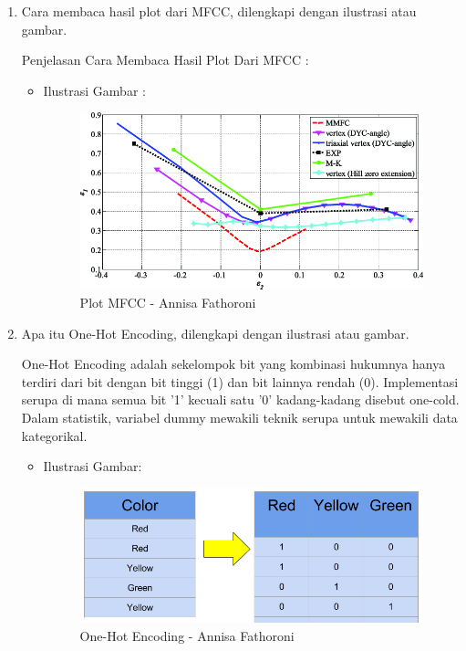\begin{enumerate}
\item Cara membaca hasil plot dari MFCC, dilengkapi dengan ilustrasi atau gambar.

Penjelasan Cara Membaca Hasil Plot Dari MFCC :
\begin{itemize}
\item Ilustrasi Gambar :
\begin{figure}[!hbtp]
\centering
\includegraphics[scale=0.4]{figures/Chapter6AnnisaFathoroni5.png}
\caption{Plot MFCC - Annisa Fathoroni}
\label{Plot MFCC - Annisa Fathoroni}
\end{figure}

\end{itemize}

\item Apa itu One-Hot Encoding, dilengkapi dengan ilustrasi atau gambar.


One-Hot Encoding adalah sekelompok bit yang kombinasi hukumnya hanya terdiri dari bit dengan bit tinggi (1) dan bit lainnya rendah (0). Implementasi serupa di mana semua bit '1' kecuali satu '0' kadang-kadang disebut one-cold. Dalam statistik, variabel dummy mewakili teknik serupa untuk mewakili data kategorikal.
\begin{itemize}
\item Ilustrasi Gambar:

\begin{figure}[!hbtp]
\centering
\includegraphics[scale=0.4]{figures/Chapter6AnnisaFathoroni6.png}
\caption{One-Hot Encoding - Annisa Fathoroni}
\label{One-Hot Encoding - Annisa Fathoroni}
\end{figure}


\end{itemize}
\end{enumerate}

